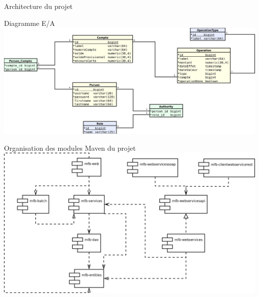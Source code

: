 \begin{frame}
	\begin{center}
		\huge{Architecture du projet}
	\end{center}
\end{frame}

\begin{frame}{Diagramme E/A}
	\includegraphics[scale=0.2]{diagramme_modele.png}
\end{frame}

\begin{frame}{Organisation des modules Maven du projet}
	\includegraphics[scale=0.2]{diagramme_modules.png}
\end{frame}


